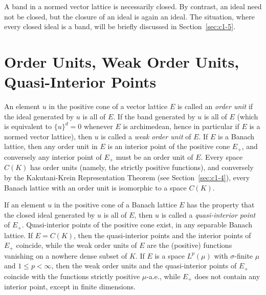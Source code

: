 A band in a normed vector lattice is necessarily closed.
By contrast, an ideal need not be closed, but the closure of an ideal is again an ideal.
The situation, where every closed ideal is a band, will be briefly discussed in Section~\ref{sec:c1-5}.
\section{Order Units, Weak Order Units, Quasi-Interior Points}\label{sec:c1-2}%

An element $ u $ in the positive cone of a vector lattice $ E $ is called an \emph{order unit} if the ideal generated by $ u $ is all of $ E $.
If the band generated by $ u $ is all of $ E $ (which is equivalent to $ \{u\}^{d} = 0 $ whenever $ E $ is archimedean, hence in particular if $ E $ is a normed vector lattice), then $ u $ is called a \emph{weak order unit} of $ E $.
If $ E $ is a Banach lattice, then any order unit in $ E $ is an interior point of the positive cone $ E_{+} $, and conversely any interior point of $ E_{+} $ must be an order unit of $ E $.
Every space $ C(K) $ has order units (namely, the strictly positive functions), and conversely by the Kakutani-Krein Representation Theorem (see Section~\ref{sec:c1-4}), every Banach lattice with an order unit is isomorphic to a space $ C(K) $.

If an element $ u $ in the positive cone of a Banach lattice $ E $ has the property that the closed ideal generated by $ u $ is all of $ E $, then $ u $ is called a \emph{quasi-interior point} of $ E_{+} $.
Quasi-interior points of the positive cone exist, \eg in any separable Banach lattice.
If $ E = C(K) $, then the quasi-interior points and the interior points of $ E_{+} $ coincide, while the weak order units of $ E $ are the (positive) functions vanishing on a nowhere dense subset of $ K $.
If $ E $ is a space $ L^{p}(\mu) $ with $ \sigma $-finite $ \mu $ and $ 1 \leq p < \infty $, then the weak order units and the quasi-interior points of $ E_{+} $ coincide with the functions strictly positive $ \mu $-a.e., while $ E_{+} $ does not contain any interior point, except in finite dimensions.
